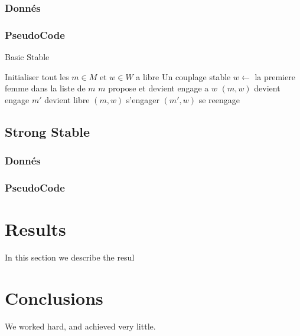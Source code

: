 \documentclass[11pt]{article}
\begin{document}
\subsubsection{Donn\'es}
\subsubsection{PseudoCode}
\begin{algorithm}
\caption{Basic Stable}
\begin{algorithmic} 
\REQUIRE Initialiser tout les $m \in M$ et $w \in W$ a libre
\ENSURE Un couplage stable
\STATE $w \leftarrow$ la premiere femme dans la liste de $m$
\STATE $m$ propose et devient engage a $w$
\STATE $(m, w)$ devient engage
\STATE $m'$ devient libre
\STATE $(m, w)$ s'engager
\ELSE
\STATE $(m', w)$ se reengage
\ENDIF
\ENDIF
\ENDWHILE
\end{algorithmic}
\end{algorithm}

    
\subsection{Strong Stable}
\subsubsection{Donn\'es}
\subsubsection{PseudoCode}

\section{Results}\label{results}
In this section we describe the resul

\section{Conclusions}\label{conclusions}
We worked hard, and achieved very little.



\end{document}
